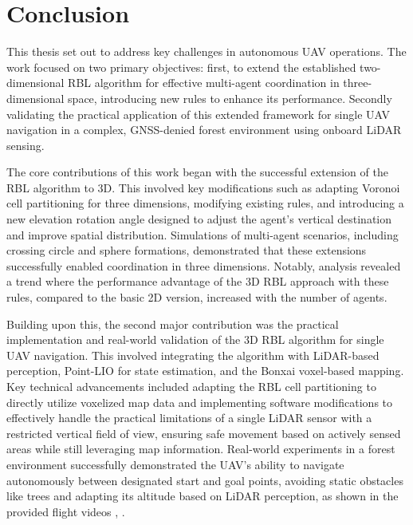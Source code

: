 
\chapter{Conclusion\label{chap:conclusion}}

This thesis set out to address key challenges in autonomous \ac{UAV} operations. 
The work focused on two primary objectives: first, to extend the established two-dimensional \ac{RBL} algorithm for effective multi-agent coordination in three-dimensional space, introducing new rules to enhance its performance. 
Secondly validating the practical application of this extended framework for single  \ac{UAV} navigation in a complex, GNSS-denied forest environment using onboard \ac{LiDAR} sensing.

The core contributions of this work began with the successful extension of the \ac{RBL} algorithm to 3D. 
This involved key modifications such as adapting Voronoi cell partitioning for three dimensions, modifying existing rules, and introducing a new elevation rotation angle designed to adjust the agent's vertical destination and improve spatial distribution. 
Simulations of multi-agent scenarios, including crossing circle and sphere formations, demonstrated that these extensions successfully enabled coordination in three dimensions. 
Notably, analysis revealed a trend where the performance advantage of the 3D \ac{RBL} approach with these rules, compared to the basic 2D version, increased with the number of agents.

Building upon this, the second major contribution was the practical implementation and real-world validation of the 3D \ac{RBL} algorithm for single  \ac{UAV} navigation. 
This involved integrating the algorithm with \ac{LiDAR}-based perception, Point-LIO for state estimation, and the Bonxai voxel-based mapping. 
Key technical advancements included adapting the \ac{RBL} cell partitioning to directly utilize voxelized map data and implementing software modifications to effectively handle the practical limitations of a single \ac{LiDAR} sensor with a restricted vertical field of view, ensuring safe movement based on actively sensed areas while still leveraging map information. 
Real-world experiments in a forest environment successfully demonstrated the  \ac{UAV}'s ability to navigate autonomously between designated start and goal points, avoiding static obstacles like trees and adapting its altitude based on \ac{LiDAR} perception, as shown in the provided flight videos \cite{aggressive_flight}, \cite{conservative_flight}.

